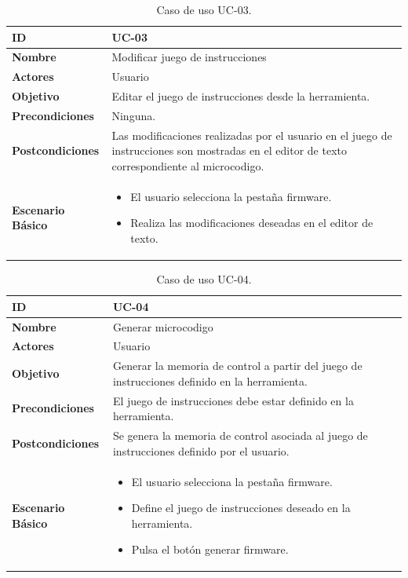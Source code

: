 \begin{center}
\begin{table}[htbp]
\centering
\caption{Caso de uso UC-03.}
\begin{tabular}{@{}p{2.5cm} p{9cm}@{}} 
\toprule
\textbf{ID}	& UC-03  \\
\midrule
\textbf{Nombre} 		& Modificar juego de instrucciones   \\
\midrule
\textbf{Actores} 		&	Usuario  \\
\midrule
\textbf{Objetivo} 	&	Editar el juego de instrucciones desde la herramienta. 	 \\
\midrule
\textbf{Precondiciones}	&	Ninguna.   \\
\midrule
\textbf{Postcondiciones} 	& Las modificaciones realizadas por el usuario en el juego de instrucciones son mostradas en el editor de texto correspondiente al \gls{microcodigo}.   \\
\midrule
\textbf{Escenario Básico} 	&  \begin{itemize}
\item El usuario selecciona la pestaña firmware.
\item Realiza las modificaciones deseadas en el editor de texto.
\end{itemize} \\
\bottomrule
\end{tabular}
\label{tab:uc03}
\end{table}
\end{center}

\begin{center}
\begin{table}[htbp]
\centering
\caption{Caso de uso UC-04.}
\begin{tabular}{@{}p{2.5cm} p{9cm}@{}} 
\toprule
\textbf{ID}	& UC-04  \\
\midrule
\textbf{Nombre} 		& Generar \gls{microcodigo}   \\
\midrule
\textbf{Actores} 		&	Usuario  \\
\midrule
\textbf{Objetivo} 	&	Generar la memoria de control a partir del juego de instrucciones definido en la herramienta. 	 \\
\midrule
\textbf{Precondiciones}	&	El juego de instrucciones debe estar definido en la herramienta.   \\
\midrule
\textbf{Postcondiciones} 	& Se genera la memoria de control asociada al juego de instrucciones definido por el usuario.   \\
\midrule
\textbf{Escenario Básico} 	&  \begin{itemize}
\item El usuario selecciona la pestaña firmware.
\item Define el juego de instrucciones deseado en la herramienta.
\item Pulsa el botón generar firmware.
\end{itemize} \\
\bottomrule
\end{tabular}
\label{tab:uc04}
\end{table}
\end{center}

